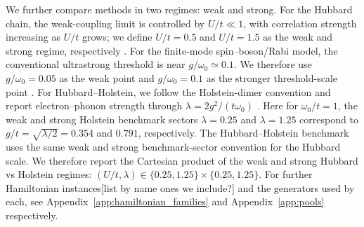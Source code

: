 \documentclass[
  reprint,
  amsmath,
  amssymb,
  aps,
  pra,
  nofootinbib,
  superscriptaddress,
  floatfix
]{revtex4-2}
\newcommand{\placeholder}[1]{\textcolor{red!70!black}{\ifmmode\left[#1\right]\else\textsf{[#1]}\fi}}
\begin{document}
We further compare methods in two regimes: weak and strong. For the Hubbard chain, the weak-coupling limit is controlled by
\(U/t\ll 1\), with correlation strength increasing as \(U/t\) grows;
we define \(U/t=0.5\) and \(U/t=1.5\) as the weak and strong regime, respectively
\cite{Arovas2022Hubbard}.  
For the finite-mode spin--boson/Rabi model, the conventional ultrastrong
threshold is near \(g/\omega_0\simeq 0.1\).  We therefore use
\(g/\omega_0=0.05\) as the weak point and \(g/\omega_0=0.1\) as the
stronger threshold-scale point
\cite{Kockum2019Ultrastrong,FornDiaz2019Ultrastrong}.
For Hubbard--Holstein, we follow the Holstein-dimer convention and report electron--phonon strength through \(\lambda=2g^2/(t\omega_0)\) \cite{Sakkinen2015HolsteinDimer}.  Here for
\(\omega_0/t=1\), the weak and strong Holstein benchmark sectors
\(\lambda=0.25\) and \(\lambda=1.25\) correspond to
\(g/t=\sqrt{\lambda/2}=0.354\) and \(0.791\), respectively.  The
Hubbard--Holstein benchmark uses the same weak and strong benchmark-sector convention for the Hubbard scale. We therefore report the Cartesian product of the weak and strong Hubbard vs Holstein regimes:
\((U/t,\lambda)\in\{0.25,1.25\}\times\{0.25,1.25\}\).
For further Hamiltonian instances\placeholder{list by name ones we include?} and the generators used by each, see Appendix~\ref{app:hamiltonian_families} and Appendix~\ref{app:pools} respectively. 
\end{document}

